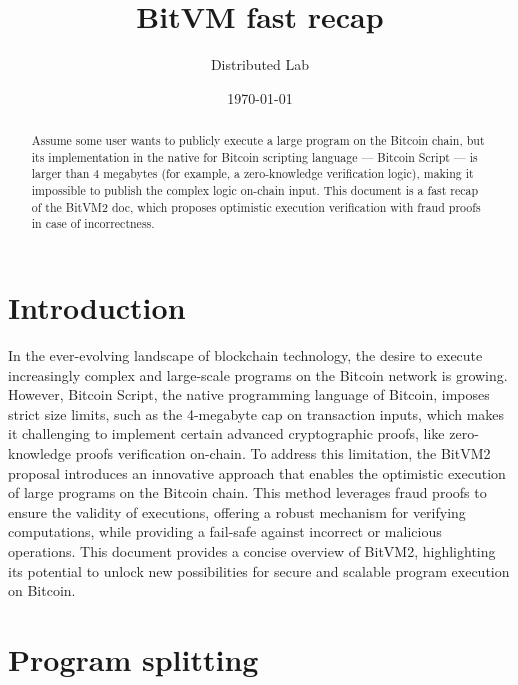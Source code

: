 \documentclass[11pt]{article}
\author{Distributed Lab}
\date{\today}
\title{BitVM fast recap}
\begin{document}
\maketitle

\begin{abstract}
  Assume some user wants to publicly execute a large program on the
  Bitcoin chain, but its implementation in the native for Bitcoin
  scripting language --- Bitcoin Script --- is larger than 4 megabytes
  (for example, a zero-knowledge verification logic), making it
  impossible to publish the complex logic on-chain input. This
  document is a fast recap of the BitVM2 doc, which proposes
  optimistic execution verification with fraud proofs in case of
  incorrectness.
\end{abstract}

\setcounter{tocdepth}{2}
\tableofcontents

\section{Introduction}\label{sec:intro}

In the ever-evolving landscape of blockchain technology, the desire to
execute increasingly complex and large-scale programs on the
Bitcoin\autocite{bitcoin_paper} network is growing. However, Bitcoin
Script, the native programming language of Bitcoin, imposes strict
size limits, such as the 4-megabyte cap on transaction inputs, which
makes it challenging to implement certain advanced cryptographic
proofs, like zero-knowledge proofs verification on-chain. To address
this limitation, the BitVM2\autocite{bitvm2} proposal introduces an
innovative approach that enables the optimistic execution of large
programs on the Bitcoin chain. This method leverages fraud proofs to
ensure the validity of executions, offering a robust mechanism for
verifying computations, while providing a fail-safe against incorrect
or malicious operations. This document provides a concise overview of
BitVM2, highlighting its potential to unlock new possibilities for
secure and scalable program execution on Bitcoin.

\section{Program splitting}\label{sec:program-splitting}
\end{document}

